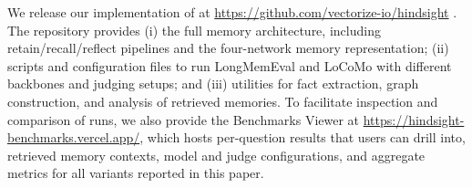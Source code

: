 We release our implementation of \our at \url{https://github.com/vectorize-io/hindsight}
. The repository provides (i) the full memory architecture, including retain/recall/reflect pipelines and the four-network memory representation; (ii) scripts and configuration files to run LongMemEval and LoCoMo with different backbones and judging setups; and (iii) utilities for fact extraction, graph construction, and analysis of retrieved memories. To facilitate inspection and comparison of runs, we also provide the \our Benchmarks Viewer at \url{https://hindsight-benchmarks.vercel.app/}, which hosts per-question results that users can drill into, retrieved memory contexts, model and judge configurations, and aggregate metrics for all \our variants reported in this paper.

